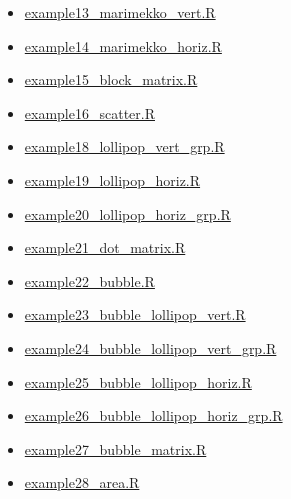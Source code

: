 \documentclass[letterpaper,10pt,english]{sphinxmanual}
\begin{document}
{\begin{minipage}{0.95\linewidth}
\begin{itemize}
\item {} 
{\hyperref[dimple/gallery:example13-marimekko-vert-r]{example13\_marimekko\_vert.R}}

\item {} 
{\hyperref[dimple/gallery:example14-marimekko-horiz-r]{example14\_marimekko\_horiz.R}}

\item {} 
{\hyperref[dimple/gallery:example15-block-matrix-r]{example15\_block\_matrix.R}}

\item {} 
{\hyperref[dimple/gallery:example16-scatter-r]{example16\_scatter.R}}

\item {} 
{\hyperref[dimple/gallery:example18-lollipop-vert-grp-r]{example18\_lollipop\_vert\_grp.R}}

\item {} 
{\hyperref[dimple/gallery:example19-lollipop-horiz-r]{example19\_lollipop\_horiz.R}}

\item {} 
{\hyperref[dimple/gallery:example20-lollipop-horiz-grp-r]{example20\_lollipop\_horiz\_grp.R}}

\item {} 
{\hyperref[dimple/gallery:example21-dot-matrix-r]{example21\_dot\_matrix.R}}

\item {} 
{\hyperref[dimple/gallery:example22-bubble-r]{example22\_bubble.R}}

\item {} 
{\hyperref[dimple/gallery:example23-bubble-lollipop-vert-r]{example23\_bubble\_lollipop\_vert.R}}

\item {} 
{\hyperref[dimple/gallery:example24-bubble-lollipop-vert-grp-r]{example24\_bubble\_lollipop\_vert\_grp.R}}

\item {} 
{\hyperref[dimple/gallery:example25-bubble-lollipop-horiz-r]{example25\_bubble\_lollipop\_horiz.R}}

\item {} 
{\hyperref[dimple/gallery:example26-bubble-lollipop-horiz-grp-r]{example26\_bubble\_lollipop\_horiz\_grp.R}}

\item {} 
{\hyperref[dimple/gallery:example27-bubble-matrix-r]{example27\_bubble\_matrix.R}}

\item {} 
{\hyperref[dimple/gallery:example28-area-r]{example28\_area.R}}


\end{itemize}
\end{minipage}}
\end{document}
